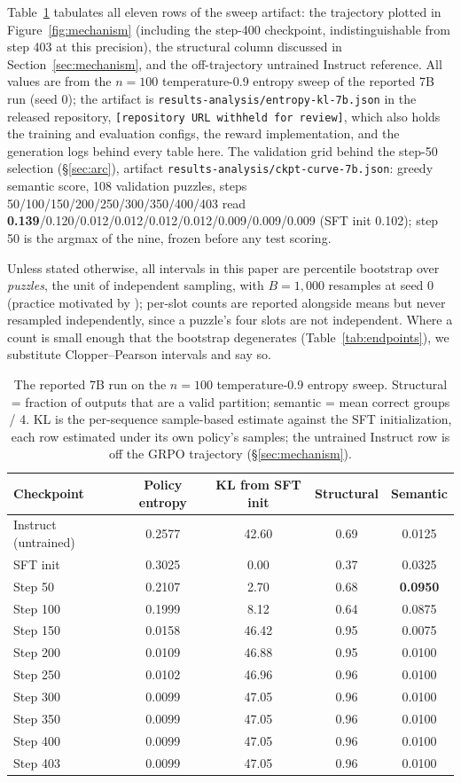 \documentclass{article}
\newcommand{\repourl}{\texttt{[repository URL withheld for review]}}
\begin{document}
Table~\ref{tab:ckpt} tabulates all eleven rows of the sweep artifact: the
trajectory plotted in Figure~\ref{fig:mechanism} (including the step-400
checkpoint, indistinguishable from step 403 at this precision), the
structural column discussed in Section~\ref{sec:mechanism}, and the
off-trajectory untrained Instruct reference. All values are from the $n=100$
temperature-0.9
entropy sweep of the reported 7B run (seed 0); the artifact is
\texttt{results-analysis/entropy-kl-7b.json} in the released repository,
\repourl{}, which also holds the
training and evaluation configs, the reward implementation, and the
generation logs behind every table here. The validation grid behind the step-50 selection (\S\ref{sec:arc}), artifact \texttt{results-analysis/ckpt-curve-7b.json}: greedy semantic score, 108 validation puzzles, steps 50/100/150/200/250/300/350/400/403 read \textbf{0.139}/0.120/0.012/0.012/0.012/0.012/0.009/0.009/0.009 (SFT init 0.102); step 50 is the argmax of the nine, frozen before any test scoring.

Unless stated otherwise, all intervals in this paper are percentile bootstrap over \emph{puzzles}, the unit of independent sampling, with $B=1{,}000$ resamples at seed 0 (practice motivated by \citealp{agarwal2021}); per-slot counts are reported alongside
means but never resampled independently, since a puzzle's four slots are
not independent. Where a count is small enough that the bootstrap
degenerates (Table~\ref{tab:endpoints}), we substitute Clopper--Pearson
intervals and say so.

\begin{table}[h]
\centering
\caption{The reported 7B run on the $n=100$ temperature-0.9 entropy sweep.
Structural = fraction of outputs that are a valid partition; semantic = mean
correct groups / 4. KL is the per-sequence sample-based estimate against the
SFT initialization, each row estimated under its own policy's samples; the
untrained Instruct row is off the GRPO trajectory
(\S\ref{sec:mechanism}).}
\label{tab:ckpt}
\begin{tabular}{lcccc}
\toprule
Checkpoint & Policy entropy & KL from SFT init & Structural & Semantic \\
\midrule
Instruct (untrained) & 0.2577 & 42.60 & 0.69 & 0.0125 \\
\midrule
SFT init  & 0.3025 & 0.00  & 0.37 & 0.0325 \\
Step 50   & 0.2107 & 2.70  & 0.68 & \textbf{0.0950} \\
Step 100  & 0.1999 & 8.12  & 0.64 & 0.0875 \\
Step 150  & 0.0158 & 46.42 & 0.95 & 0.0075 \\
Step 200  & 0.0109 & 46.88 & 0.95 & 0.0100 \\
Step 250  & 0.0102 & 46.96 & 0.96 & 0.0100 \\
Step 300  & 0.0099 & 47.05 & 0.96 & 0.0100 \\
Step 350  & 0.0099 & 47.05 & 0.96 & 0.0100 \\
Step 400  & 0.0099 & 47.05 & 0.96 & 0.0100 \\
Step 403  & 0.0099 & 47.05 & 0.96 & 0.0100 \\
\bottomrule
\end{tabular}
\end{table}
\end{document}
